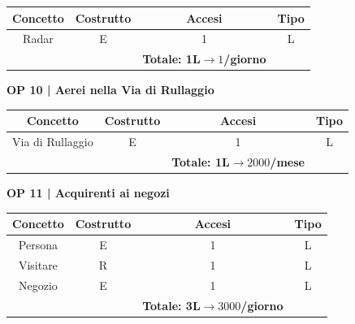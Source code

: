 \begin{tabular}{ c c c c} %
	\hline
	\textbf{Concetto} & \textbf{Costrutto} & \textbf{Accesi} & \textbf{Tipo}\\
	\hline
	\textsf{\small Radar} & \textsf{\small E} & \textsf{\small 1} &  \textsf{\small L}\\
	\hline
	\textsf{\small } & \textsf{\small } & \textbf{Totale: 1L$\rightarrow 1$/giorno } \textsf{\small } & \textsf{\small }\\
	\hline
\end{tabular}

\vspace{.6cm}


\textbf{\small OP 10 | Aerei nella Via di Rullaggio}\\

\begin{tabular}{ c c c c} %
	\hline
	\textbf{Concetto} & \textbf{Costrutto} & \textbf{Accesi} & \textbf{Tipo}\\
	\hline
	\textsf{\small Via di Rullaggio} & \textsf{\small E} & \textsf{\small 1} &  \textsf{\small L}\\
	\hline
	\textsf{\small } & \textsf{\small } & \textbf{Totale: 1L$\rightarrow 2000$/mese } \textsf{\small } & \textsf{\small }\\
	\hline
\end{tabular}

\vspace{.6cm}


\textbf{\small OP 11 | Acquirenti ai negozi}\\ %

\begin{tabular}{ c c c c}
	\hline
	\textbf{Concetto} & \textbf{Costrutto} & \textbf{Accesi} & \textbf{Tipo}\\
	\hline
	\textsf{\small Persona} & \textsf{\small E} & \textsf{\small 1} &  \textsf{\small L}\\
	\hline
	\textsf{\small Visitare} & \textsf{\small R} & \textsf{\small 1} &  \textsf{\small L}\\
	\hline
	\textsf{\small Negozio} & \textsf{\small E} & \textsf{\small 1} &  \textsf{\small L}\\
	\hline
	\textsf{\small } & \textsf{\small } & \textbf{Totale: 3L$\rightarrow 3000$/giorno } \textsf{\small } & \textsf{\small }\\ %
	\hline
\end{tabular}

